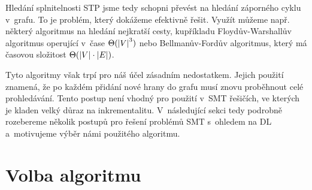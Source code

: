 Hledání splnitelnosti STP jsme tedy schopni převést na hledání záporného cyklu v~grafu. To je problém, který dokážeme efektivně řešit. Využít můžeme např. některý algoritmus na hledání nejkratší cesty, kupříkladu Floydův-Warshallův algoritmus operující v~čase $\Theta(\left|{V}\right|^3)$ nebo Bellmanův-Fordův algoritmus, který má časovou složitost $\Theta(\left|{V}\right|\cdot\left|{E}\right|)$.

Tyto algoritmy však trpí pro náš účel zásadním nedostatkem. Jejich použití znamená, že po každém přidání nové hrany do grafu musí znovu proběhnout celé prohledávání. Tento postup není vhodný pro použití v~SMT řešičích, ve kterých je kladen velký důraz na inkrementalitu. V~následující sekci tedy podrobně rozebereme několik postupů pro řešení problémů SMT s~ohledem na DL a~motivujeme výběr námi použitého algoritmu. 

\section{Volba algoritmu}

